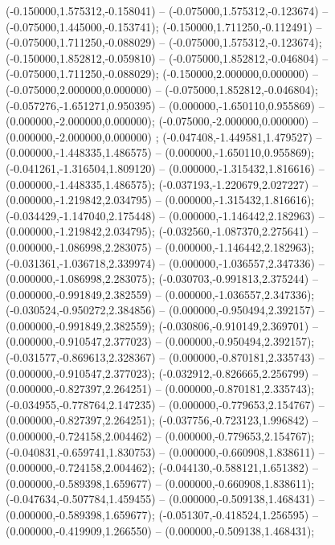  (-0.150000,1.575312,-0.158041) -- (-0.075000,1.575312,-0.123674) -- (-0.075000,1.445000,-0.153741);
 (-0.150000,1.711250,-0.112491) -- (-0.075000,1.711250,-0.088029) -- (-0.075000,1.575312,-0.123674);
 (-0.150000,1.852812,-0.059810) -- (-0.075000,1.852812,-0.046804) -- (-0.075000,1.711250,-0.088029);
 (-0.150000,2.000000,0.000000) -- (-0.075000,2.000000,0.000000) -- (-0.075000,1.852812,-0.046804);
 (-0.057276,-1.651271,0.950395) -- (0.000000,-1.650110,0.955869) -- (0.000000,-2.000000,0.000000);
 (-0.075000,-2.000000,0.000000) -- (0.000000,-2.000000,0.000000) ;
 (-0.047408,-1.449581,1.479527) -- (0.000000,-1.448335,1.486575) -- (0.000000,-1.650110,0.955869);
 (-0.041261,-1.316504,1.809120) -- (0.000000,-1.315432,1.816616) -- (0.000000,-1.448335,1.486575);
 (-0.037193,-1.220679,2.027227) -- (0.000000,-1.219842,2.034795) -- (0.000000,-1.315432,1.816616);
 (-0.034429,-1.147040,2.175448) -- (0.000000,-1.146442,2.182963) -- (0.000000,-1.219842,2.034795);
 (-0.032560,-1.087370,2.275641) -- (0.000000,-1.086998,2.283075) -- (0.000000,-1.146442,2.182963);
 (-0.031361,-1.036718,2.339974) -- (0.000000,-1.036557,2.347336) -- (0.000000,-1.086998,2.283075);
 (-0.030703,-0.991813,2.375244) -- (0.000000,-0.991849,2.382559) -- (0.000000,-1.036557,2.347336);
 (-0.030524,-0.950272,2.384856) -- (0.000000,-0.950494,2.392157) -- (0.000000,-0.991849,2.382559);
 (-0.030806,-0.910149,2.369701) -- (0.000000,-0.910547,2.377023) -- (0.000000,-0.950494,2.392157);
 (-0.031577,-0.869613,2.328367) -- (0.000000,-0.870181,2.335743) -- (0.000000,-0.910547,2.377023);
 (-0.032912,-0.826665,2.256799) -- (0.000000,-0.827397,2.264251) -- (0.000000,-0.870181,2.335743);
 (-0.034955,-0.778764,2.147235) -- (0.000000,-0.779653,2.154767) -- (0.000000,-0.827397,2.264251);
 (-0.037756,-0.723123,1.996842) -- (0.000000,-0.724158,2.004462) -- (0.000000,-0.779653,2.154767);
 (-0.040831,-0.659741,1.830753) -- (0.000000,-0.660908,1.838611) -- (0.000000,-0.724158,2.004462);
 (-0.044130,-0.588121,1.651382) -- (0.000000,-0.589398,1.659677) -- (0.000000,-0.660908,1.838611);
 (-0.047634,-0.507784,1.459455) -- (0.000000,-0.509138,1.468431) -- (0.000000,-0.589398,1.659677);
 (-0.051307,-0.418524,1.256595) -- (0.000000,-0.419909,1.266550) -- (0.000000,-0.509138,1.468431);
